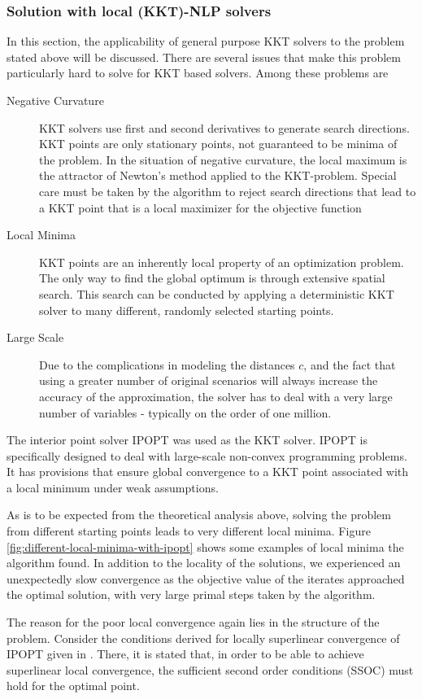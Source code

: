 \subsubsection{Solution with local (KKT)-NLP solvers}
In this section, the applicability of general purpose KKT solvers to the problem stated above will be discussed. There are several issues that make this problem particularly hard to solve for KKT based solvers. Among these problems are
\begin{description}
\item[Negative Curvature] KKT solvers use first and second derivatives to generate search directions. KKT points are only stationary points, not guaranteed to be minima of the problem. In the situation of negative curvature, the local maximum is the attractor of Newton's method applied to the KKT-problem. Special care must be taken by the algorithm to reject search directions that lead to a KKT point that is a local maximizer for the objective function
\item[Local Minima] KKT points are an inherently local property of an optimization problem. The only way to find the global optimum is through extensive spatial search. This search can be conducted by applying a deterministic KKT solver to many different, randomly selected starting points.
\item[Large Scale] Due to the complications in modeling the distances $c$, and the fact that using a greater number of original scenarios will always increase the accuracy of the approximation, the solver has to deal with a very large number of variables - typically on the order of one million.
\end{description}
The interior point solver IPOPT \cite{IpoptImplementation2006} was used as the KKT solver. IPOPT is specifically designed to deal with large-scale non-convex programming problems. It has provisions that ensure global convergence to a KKT point associated with a local minimum under weak assumptions.

As is to be expected from the theoretical analysis above, solving the problem from different starting points leads to very different local minima. Figure \ref{fig:different-local-minima-with-ipopt} shows some examples of local minima the algorithm found. In addition to the locality of the solutions, we experienced an unexpectedly slow convergence as the objective value of the iterates approached the optimal solution, with very large primal steps taken by the algorithm.

The reason for the poor local convergence again lies in the structure of the problem. Consider the conditions derived for locally superlinear convergence of IPOPT given in . There, it is stated that, in order to be able to achieve superlinear local convergence, the sufficient second order conditions (SSOC) must hold for the optimal point.

